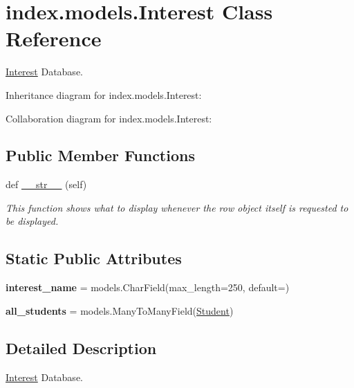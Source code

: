 \hypertarget{classindex_1_1models_1_1Interest}{}\section{index.\+models.\+Interest Class Reference}
\label{classindex_1_1models_1_1Interest}


\hyperlink{classindex_1_1models_1_1Interest}{Interest} Database.  




Inheritance diagram for index.\+models.\+Interest\+:


Collaboration diagram for index.\+models.\+Interest\+:
\subsection*{Public Member Functions}
\begin{DoxyCompactItemize}
\item 
def \hyperlink{classindex_1_1models_1_1Interest_a3ca3a9a183c77e9975c6c69ddc5362a5}{\+\_\+\+\_\+str\+\_\+\+\_\+} (self)
\begin{DoxyCompactList}\small\item\em This function shows what to display whenever the row object itself is requested to be displayed. \end{DoxyCompactList}\end{DoxyCompactItemize}
\subsection*{Static Public Attributes}
\begin{DoxyCompactItemize}
\item 
\mbox{\label{classindex_1_1models_1_1Interest_a73e68b09c4cd58f3ff104098e3b60b02}} 
{\bfseries interest\+\_\+name} = models.\+Char\+Field(max\+\_\+length=250, default=\textquotesingle{}\textquotesingle{})
\item 
\mbox{\label{classindex_1_1models_1_1Interest_a7252272df9ca6fe53384223bbcd284e2}} 
{\bfseries all\+\_\+students} = models.\+Many\+To\+Many\+Field(\hyperlink{classindex_1_1models_1_1Student}{Student})
\end{DoxyCompactItemize}


\subsection{Detailed Description}
\hyperlink{classindex_1_1models_1_1Interest}{Interest} Database. 

